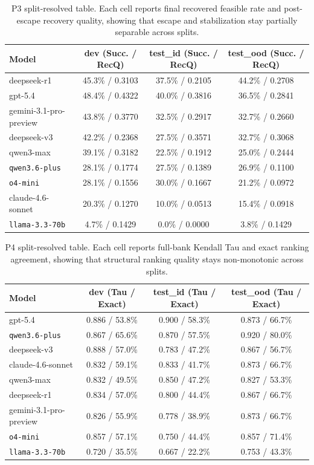 \begin{table}[t]
\caption{P3 split-resolved table. Each cell reports final recovered feasible rate and post-escape recovery quality, showing that escape and stabilization stay partially separable across splits.}
\label{tab:appendix_p3_split}
\centering
\small
\begin{tabular}{lccc}
\toprule
Model & dev (Succ. / RecQ) & test\_id (Succ. / RecQ) & test\_ood (Succ. / RecQ) \\
\midrule
deepseek-r1 & 45.3\% / 0.3103 & 37.5\% / 0.2105 & 44.2\% / 0.2708 \\
gpt-5.4 & 48.4\% / 0.4322 & 40.0\% / 0.3816 & 36.5\% / 0.2841 \\
gemini-3.1-pro-preview & 43.8\% / 0.3770 & 32.5\% / 0.2917 & 32.7\% / 0.2660 \\
deepseek-v3 & 42.2\% / 0.2368 & 27.5\% / 0.3571 & 32.7\% / 0.3068 \\
qwen3-max & 39.1\% / 0.3182 & 22.5\% / 0.1912 & 25.0\% / 0.2444 \\
\texttt{qwen3.6-plus} & 28.1\% / 0.1774 & 27.5\% / 0.1389 & 26.9\% / 0.1100 \\
\texttt{o4-mini} & 28.1\% / 0.1556 & 30.0\% / 0.1667 & 21.2\% / 0.0972 \\
claude-4.6-sonnet & 20.3\% / 0.1270 & 10.0\% / 0.0513 & 15.4\% / 0.0918 \\
\texttt{llama-3.3-70b} & 4.7\% / 0.1429 & 0.0\% / 0.0000 & 3.8\% / 0.1429 \\
\bottomrule
\end{tabular}
\end{table}

\begin{table}[t]
\caption{P4 split-resolved table. Each cell reports full-bank Kendall Tau and exact ranking agreement, showing that structural ranking quality stays non-monotonic across splits.}
\label{tab:appendix_p4_split}
\centering
\small
\begin{tabular}{lccc}
\toprule
Model & dev (Tau / Exact) & test\_id (Tau / Exact) & test\_ood (Tau / Exact) \\
\midrule
gpt-5.4 & 0.886 / 53.8\% & 0.900 / 58.3\% & 0.873 / 66.7\% \\
\texttt{qwen3.6-plus} & 0.867 / 65.6\% & 0.870 / 57.5\% & 0.920 / 80.0\% \\
deepseek-v3 & 0.888 / 57.0\% & 0.783 / 47.2\% & 0.867 / 56.7\% \\
claude-4.6-sonnet & 0.832 / 59.1\% & 0.833 / 41.7\% & 0.873 / 66.7\% \\
qwen3-max & 0.832 / 49.5\% & 0.850 / 47.2\% & 0.827 / 53.3\% \\
deepseek-r1 & 0.834 / 57.0\% & 0.800 / 44.4\% & 0.867 / 66.7\% \\
gemini-3.1-pro-preview & 0.826 / 55.9\% & 0.778 / 38.9\% & 0.873 / 66.7\% \\
\texttt{o4-mini} & 0.857 / 57.1\% & 0.750 / 44.4\% & 0.857 / 71.4\% \\
\texttt{llama-3.3-70b} & 0.720 / 35.5\% & 0.667 / 22.2\% & 0.753 / 43.3\% \\
\bottomrule
\end{tabular}
\end{table}
